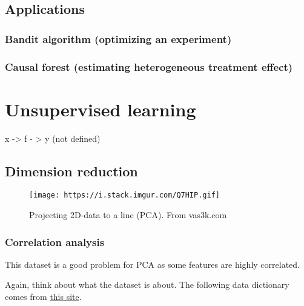 \documentclass[
]{book}
\begin{document}
\hypertarget{applications-2}{%
\subsection{Applications}\label{applications-2}}

\hypertarget{bandit-algorithm-optimizing-an-experiment}{%
\subsubsection{Bandit algorithm (optimizing an experiment)}\label{bandit-algorithm-optimizing-an-experiment}}

\hypertarget{causal-forest-estimating-heterogeneous-treatment-effect}{%
\subsubsection{Causal forest (estimating heterogeneous treatment effect)}\label{causal-forest-estimating-heterogeneous-treatment-effect}}

\hypertarget{unsupervised-learning}{%
\section{Unsupervised learning}\label{unsupervised-learning}}

x -\textgreater{} f - \textgreater{} y (not defined)

\hypertarget{dimension-reduction}{%
\subsection{Dimension reduction}\label{dimension-reduction}}

\begin{figure}
\centering
\texttt{[image: https://i.stack.imgur.com/Q7HIP.gif]}
\caption{Projecting 2D-data to a line (PCA). From vas3k.com}
\end{figure}

\hypertarget{correlation-analysis}{%
\subsubsection{Correlation analysis}\label{correlation-analysis}}

This dataset is a good problem for PCA as some features are highly correlated.

Again, think about what the dataset is about. The following data dictionary comes from \href{http://rstudio-pubs-static.s3.amazonaws.com/24341_184a58191486470cab97acdbbfe78ed5.html}{this site}.
\end{document}
